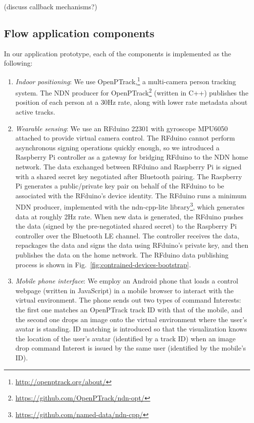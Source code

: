 (discuss callback mechanisms?)

\subsection{Flow application components}

In our application prototype, each of the components is implemented as the following:
\begin{enumerate}
\item \textit{Indoor positioning}: We use OpenPTrack,\footnote{\url{http://openptrack.org/about/}} a multi-camera person tracking system.
The NDN producer for OpenPTrack\footnote{\url{https://github.com/OpenPTrack/ndn-opt/}} (written in C++)  publishes the position of each person at a 30Hz rate, along with lower rate metadata about active tracks. 
\item \textit{Wearable sensing}: We use an RFduino 22301 with gyroscope MPU6050 attached to provide virtual camera control. 
The RFduino cannot perform asynchronous signing operations quickly enough, so we introduced a Raspberry Pi controller as a gateway for bridging RFduino to the NDN home network.
The data exchanged between RFduino and Raspberry Pi is signed with a shared secret key negotiated after Bluetooth pairing.
The Raspberry Pi generates a public/private key pair on behalf of the RFduino to be associated with the RFduino's device identity.
The RFduino runs a minimum NDN producer, implemented with the ndn-cpp-lite library\footnote{\url{https://github.com/named-data/ndn-cpp/}}, which generates data at roughly 2Hz rate.
When new data is generated, the RFduino pushes the data (signed by the pre-negotiated shared secret) to the Raspberry Pi controller over the Bluetooth LE channel.
The controller receives the data, repackages the data and signs the data using RFduino's private key, and then publishes the data on the home network.
The RFduino data publishing process is shown in Fig.~\ref{fig:contrained-devices-bootstrap}.
\item \textit{Mobile phone interface}: We employ an Android phone that loads a control webpage (written in JavaScript) in a mobile browser to interact with the virtual environment. 
The phone sends out two types of command Interests: the first one matches an OpenPTrack track ID with that of the mobile, and the second one drops an image onto the virtual environment where the user's avatar is standing. ID matching is introduced so that the visualization knows the location of the user's avatar (identified by a track ID) when an image drop command Interest is issued by the same user (identified by the mobile's ID).

\end{enumerate}
